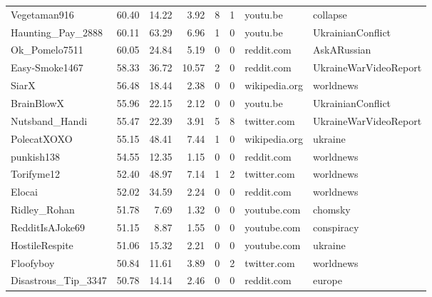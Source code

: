 \begin{tabular}{lrrrrrll}
Vegetaman916         &       60.40 &     14.22 &       3.92 &           8 &           1 &       youtu.be &               collapse \\
Haunting\_Pay\_2888    &       60.11 &     63.29 &       6.96 &           1 &           0 &       youtu.be &      UkrainianConflict \\
Ok\_Pomelo7511        &       60.05 &     24.84 &       5.19 &           0 &           0 &     reddit.com &            AskARussian \\
Easy-Smoke1467       &       58.33 &     36.72 &      10.57 &           2 &           0 &     reddit.com &  UkraineWarVideoReport \\
SiarX                &       56.48 &     18.44 &       2.38 &           0 &           0 &  wikipedia.org &              worldnews \\
BrainBlowX           &       55.96 &     22.15 &       2.12 &           0 &           0 &       youtu.be &      UkrainianConflict \\
Nutsband\_Handi       &       55.47 &     22.39 &       3.91 &           5 &           8 &    twitter.com &  UkraineWarVideoReport \\
PolecatXOXO          &       55.15 &     48.41 &       7.44 &           1 &           0 &  wikipedia.org &                ukraine \\
punkish138           &       54.55 &     12.35 &       1.15 &           0 &           0 &     reddit.com &              worldnews \\
Torifyme12           &       52.40 &     48.97 &       7.14 &           1 &           2 &    twitter.com &              worldnews \\
Elocai               &       52.02 &     34.59 &       2.24 &           0 &           0 &     reddit.com &              worldnews \\
Ridley\_Rohan         &       51.78 &      7.69 &       1.32 &           0 &           0 &    youtube.com &                chomsky \\
RedditIsAJoke69      &       51.15 &      8.87 &       1.55 &           0 &           0 &    youtube.com &             conspiracy \\
HostileRespite       &       51.06 &     15.32 &       2.21 &           0 &           0 &    youtube.com &                ukraine \\
Floofyboy            &       50.84 &     11.61 &       3.89 &           0 &           2 &    twitter.com &              worldnews \\
Disastrous\_Tip\_3347  &       50.78 &     14.14 &       2.46 &           0 &           0 &     reddit.com &                 europe \\
\bottomrule
\end{tabular}
